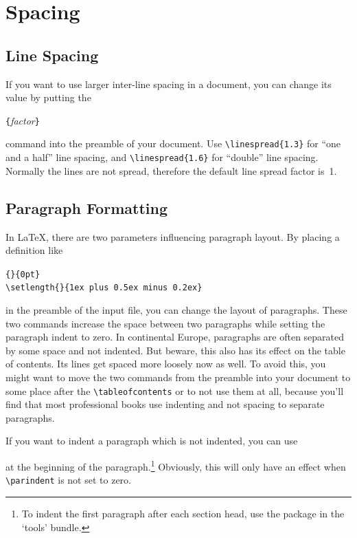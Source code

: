 \section{Spacing}
 
\subsection{Line Spacing}

 If you want to use larger inter-line spacing in a
document, you can change its value by putting the
\begin{command}
\verb|{|\emph{factor}\verb|}|
\end{command}
\noindent command into the preamble of your document.
Use \verb|\linespread{1.3}| for ``one and a half'' line
spacing, and \verb|\linespread{1.6}| for ``double'' line spacing.  Normally
the lines are not spread, therefore the default line spread factor
is~1.

 
\subsection{Paragraph Formatting}\label{parsp}

In \LaTeX{}, there are two parameters influencing paragraph layout.
By placing a definition like
\begin{code}
\verb|{|\verb|}{0pt}| \\
\verb|\setlength{|\verb|}{1ex plus 0.5ex minus 0.2ex}|
\end{code}
in the preamble of the input file, you can change the layout of
paragraphs. These two commands increase the space between two paragraphs
while setting the paragraph indent to zero.  In continental Europe,
paragraphs are often separated by some space and not indented. But
beware, this also has its effect on the table of contents. Its lines
get spaced more loosely now as well. To avoid this, you might want to
move the two commands from the preamble into your document to some
place after the \verb|\tableofcontents| or to not use them at all,
because you'll find that most professional books use indenting and not
spacing to separate paragraphs.


If you want to indent a paragraph which is not indented, you can use 
\begin{command}
\end{command}
\noindent at the beginning of the paragraph.\footnote{To indent the first paragraph after each section head, use
the  package in the `tools' bundle.} Obviously, this
will only have an effect when \verb|\parindent| is not set to zero. 

